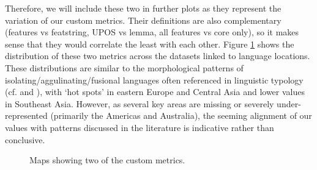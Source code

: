 \documentclass[USenglish]{article}
\begin{document}
Therefore, we will include these two in further plots as they represent the variation of our custom metrics. 
Their definitions are also complementary (features vs featstring, UPOS vs lemma, all features vs core only), so it makes sense that they would correlate the least with each other.
Figure \ref{fig:maps_custom_two} shows the distribution of these two metrics across the datasets linked to language locations. 
These distributions are similar to the morphological patterns of isolating/aggulinating/fusional languages often referenced in linguistic typology (cf. \cite{comrie1989language} and \cite{william1990typology}), with `hot spots' in eastern Europe and Central Asia and lower values in Southeast Asia. 
However, as several key areas are missing or severely under-represented (primarily the Americas and Australia), the seeming alignment of our values with patterns discussed in the literature is indicative rather than conclusive.


\begin{figure}[htbp]
  \centering
  \hfill
  \caption{Maps showing two of the custom metrics.}
  \label{fig:maps_custom_two}
\end{figure}
\end{document}
